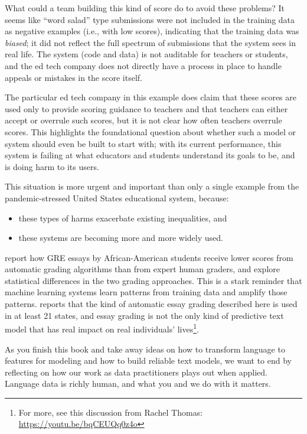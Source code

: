 \documentclass[
]{krantz}
\begin{document}
What could a team building this kind of score do to avoid these problems? It seems like ``word salad'' type submissions were not included in the training data as negative examples (i.e., with low scores), indicating that the training data was \emph{biased}; it did not reflect the full spectrum of submissions that the system sees in real life. The system (code and data) is not auditable for teachers or students, and the ed tech company does not directly have a process in place to handle appeals or mistakes in the score itself.

The particular ed tech company in this example does claim that these scores are used only to provide scoring guidance to teachers and that teachers can either accept or overrule such scores, but it is not clear how often teachers overrule scores. This highlights the foundational question about whether such a model or system should even be built to start with; with its current performance, this system is failing at what educators and students understand its goals to be, and is doing harm to its users.

This situation is more urgent and important than only a single example from the pandemic-stressed United States educational system, because:

\begin{itemize}
\item
  these types of harms exacerbate existing inequalities, and
\item
  these systems are becoming more and more widely used.
\end{itemize}

\citet{Ramineni2018} report how GRE essays by African-American students receive lower scores from automatic grading algorithms than from expert human graders, and explore statistical differences in the two grading approaches. This is a stark reminder that machine learning systems learn patterns from training data and amplify those patterns. \citet{Feathers2019} reports that the kind of automatic essay grading described here is used in at least 21 states, and essay grading is not the only kind of predictive text model that has real impact on real individuals' lives\footnote{For more, see this discussion from Rachel Thomas: \url{https://youtu.be/bqCEUQq0z4o}}.

As you finish this book and take away ideas on how to transform language to features for modeling and how to build reliable text models, we want to end by reflecting on how our work as data practitioners plays out when applied. Language data is richly human, and what you and we do with it matters.
\end{document}
